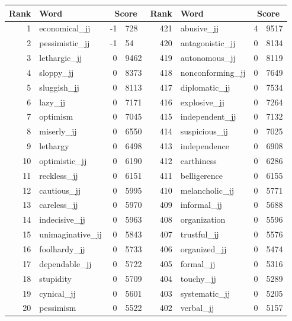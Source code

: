 \begin{table}[tbp]
    \begin{tabular}{| rlr@{.}l | rlr@{.}l |}
    \hline
    \textbf{Rank} & \textbf{Word} & \multicolumn{2}{c|}{\textbf{Score}} & \textbf{Rank} & \textbf{Word} & \multicolumn{2}{c|}{\textbf{Score}} \\
    \hline
    1 & economical\_jj & -1 & 728    &    421 & abusive\_jj & 4 & 9517 \\
    2 & pessimistic\_jj & -1 & 54    &    420 & antagonistic\_jj & 0 & 8134 \\
    3 & lethargic\_jj & 0 & 9462    &    419 & autonomous\_jj & 0 & 8119 \\
    4 & sloppy\_jj & 0 & 8373    &    418 & nonconforming\_jj & 0 & 7649 \\
    5 & sluggish\_jj & 0 & 8113    &    417 & diplomatic\_jj & 0 & 7534 \\
    6 & lazy\_jj & 0 & 7171    &    416 & explosive\_jj & 0 & 7264 \\
    7 & optimism & 0 & 7045    &    415 & independent\_jj & 0 & 7132 \\
    8 & miserly\_jj & 0 & 6550    &    414 & suspicious\_jj & 0 & 7025 \\
    9 & lethargy & 0 & 6498    &    413 & independence & 0 & 6908 \\
    10 & optimistic\_jj & 0 & 6190    &    412 & earthiness & 0 & 6286 \\
    11 & reckless\_jj & 0 & 6151    &    411 & belligerence & 0 & 6155 \\
    12 & cautious\_jj & 0 & 5995    &    410 & melancholic\_jj & 0 & 5771 \\
    13 & careless\_jj & 0 & 5970    &    409 & informal\_jj & 0 & 5688 \\
    14 & indecisive\_jj & 0 & 5963    &    408 & organization & 0 & 5596 \\
    15 & unimaginative\_jj & 0 & 5843    &    407 & trustful\_jj & 0 & 5576 \\
    16 & foolhardy\_jj & 0 & 5733    &    406 & organized\_jj & 0 & 5474 \\
    17 & dependable\_jj & 0 & 5722    &    405 & formal\_jj & 0 & 5316 \\
    18 & stupidity & 0 & 5709    &    404 & touchy\_jj & 0 & 5289 \\
    19 & cynical\_jj & 0 & 5601    &    403 & systematic\_jj & 0 & 5205 \\
    20 & pessimism & 0 & 5522    &    402 & verbal\_jj & 0 & 5157 \\

\end{tabular}
\end{table}
